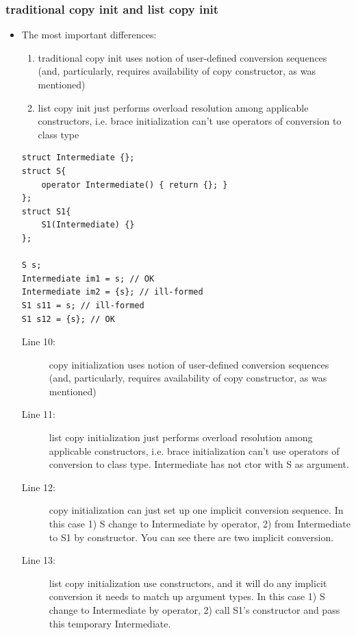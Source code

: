 \documentclass[a4paper,11pt,twoside]{book}
\begin{document}
\subsubsection{traditional copy init and list copy init}
\begin{itemize}
	\item The most important differences:
	\begin{enumerate}
		\item traditional copy init uses notion of user-defined conversion sequences (and, particularly, requires availability of copy constructor, as was mentioned)
		
		\item list copy init just performs overload resolution among applicable constructors, i.e. brace initialization can't use operators of conversion to class type
	\end{enumerate}
\begin{lstlisting}
struct Intermediate {};
struct S{
	operator Intermediate() { return {}; }
};
struct S1{
	S1(Intermediate) {}
};

S s;
Intermediate im1 = s; // OK
Intermediate im2 = {s}; // ill-formed
S1 s11 = s; // ill-formed
S1 s12 = {s}; // OK
\end{lstlisting}

	\begin{description}
		\item[Line 10:] copy initialization uses notion of user-defined conversion sequences (and, particularly, requires availability of copy constructor, as was mentioned)
		
		\item[Line 11:] list copy initialization just performs overload resolution among applicable constructors, i.e. brace initialization can't use operators of conversion to class type. Intermediate has not ctor with S as argument.
		
		\item[Line 12:] copy initialization can just set up one implicit conversion sequence. In this case 1) S change to Intermediate by operator, 2) from Intermediate to S1 by constructor.  You can see there are two implicit conversion.
		
		\item[Line 13:] list copy initialization use constructors, and it will do any implicit conversion it needs to match up argument types. In this case 1) S change to Intermediate by operator, 2) call S1's constructor and pass this temporary Intermediate.
	\end{description}
	

\end{itemize}
\end{document}
